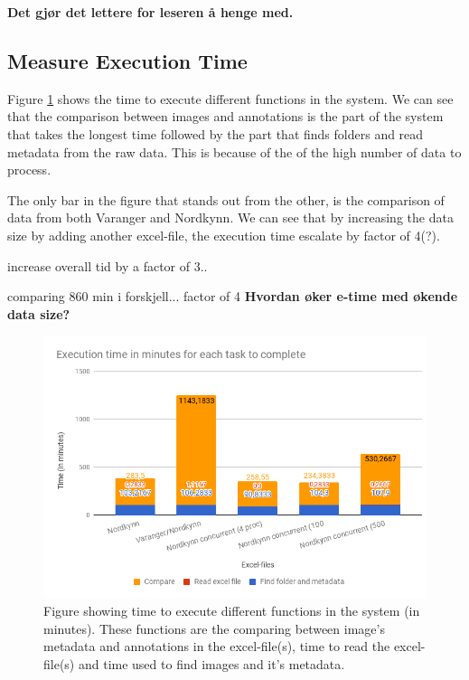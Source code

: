\documentclass[USenglish]{uit-thesis}
\begin{document}
\textbf{Det gjør det lettere for leseren å henge med.}

\subsection{Measure Execution Time}
Figure \ref{fig:time_chart500} shows the time to execute different functions in the system. We can see that the comparison between images and annotations is the part of the system that takes the longest time followed by the part that finds folders and read metadata from the raw data. This is because of the of the high number of data to process.

The only bar in the figure that stands out from the other, is the comparison of data from both Varanger and Nordkynn. We can see that by increasing the data size by adding another excel-file, the execution time escalate by factor of 4(?).


increase overall tid by a factor of 3..

comparing 860 min i forskjell... factor of 4
\textbf{Hvordan øker e-time med økende data size?}


\begin{figure}
\centering
\includegraphics[width=\textwidth]{chart_done.png}
\caption{Figure showing time to execute different functions in the system (in minutes). These functions are the comparing between image's metadata and annotations in the excel-file(s), time to read the excel-file(s) and time used to find images and it's metadata.}
\label{fig:time_chart500}
\end{figure}
\end{document}
